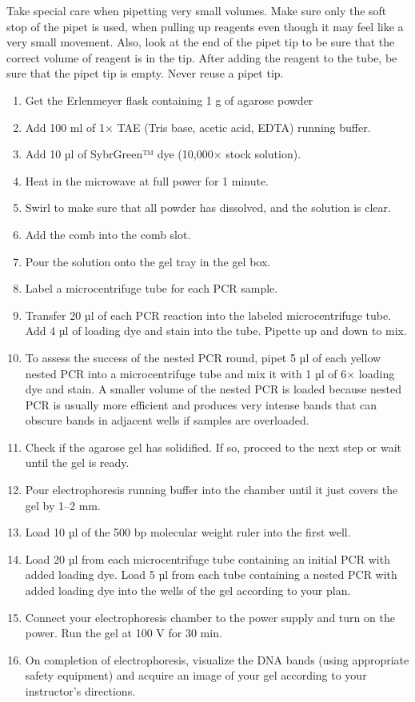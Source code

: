 \documentclass[]{book}
\providecommand{\tightlist}{%
  \setlength{\itemsep}{0pt}\setlength{\parskip}{0pt}}
\theoremstyle{definition}
\theoremstyle{definition}
\theoremstyle{definition}
\theoremstyle{remark}
\let\BeginKnitrBlock\begin \let\EndKnitrBlock\end
\begin{document}
\BeginKnitrBlock{rmdimportant}
Take special care when pipetting very small volumes. Make sure only the
soft stop of the pipet is used, when pulling up reagents even though it
may feel like a very small movement. Also, look at the end of the pipet
tip to be sure that the correct volume of reagent is in the tip. After
adding the reagent to the tube, be sure that the pipet tip is empty.
Never reuse a pipet tip.
\EndKnitrBlock{rmdimportant}

\begin{enumerate}
\def\labelenumi{\arabic{enumi}.}
\setcounter{enumi}{1}
\tightlist
\item
  Get the Erlenmeyer flask containing 1 g of agarose powder
\item
  Add 100 ml of 1× TAE (Tris base, acetic acid, EDTA) running buffer.
\item
  Add 10 µl of SybrGreen™ dye (10,000× stock solution).
\item
  Heat in the microwave at full power for 1 minute.
\item
  Swirl to make sure that all powder has dissolved, and the solution is
  clear.
\item
  Add the comb into the comb slot.
\item
  Pour the solution onto the gel tray in the gel box.
\item
  Label a microcentrifuge tube for each PCR sample.
\item
  Transfer 20 µl of each PCR reaction into the labeled microcentrifuge
  tube. Add 4 µl of loading dye and stain into the tube. Pipette up and
  down to mix.
\item
  To assess the success of the nested PCR round, pipet 5 µl of each
  yellow nested PCR into a microcentrifuge tube and mix it with 1 µl of
  6× loading dye and stain. A smaller volume of the nested PCR is loaded
  because nested PCR is usually more efficient and produces very intense
  bands that can obscure bands in adjacent wells if samples are
  overloaded.
\item
  Check if the agarose gel has solidified. If so, proceed to the next
  step or wait until the gel is ready.
\item
  Pour electrophoresis running buffer into the chamber until it just
  covers the gel by 1--2 mm.
\item
  Load 10 µl of the 500 bp molecular weight ruler into the first well.
\item
  Load 20 µl from each microcentrifuge tube containing an initial PCR
  with added loading dye. Load 5 µl from each tube containing a nested
  PCR with added loading dye into the wells of the gel according to your
  plan.
\item
  Connect your electrophoresis chamber to the power supply and turn on
  the power. Run the gel at 100 V for 30 min.
\item
  On completion of electrophoresis, visualize the DNA bands (using
  appropriate safety equipment) and acquire an image of your gel
  according to your instructor's directions.
\end{enumerate}
\end{document}
